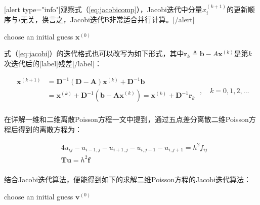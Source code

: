 \documentclass[12pt, UTF8, nofonts]{ctexart}
\begin{document}
[alert type="info"]观察式（\ref{eq:jacobicomp}），Jacobi迭代中分量$x_i^{(k+1)}$的更新顺序与$i$无关，换言之，Jacobi迭代B非常适合并行计算。[/alert]

\begin{algorithm}[H]
    choose an initial guess $\boldsymbol{x}^{(0)}$ \;
\end{algorithm}

式（\ref{eq:jacobi}）的迭代格式也可以改写为如下形式，其中$\boldsymbol{r}_k\triangleq \boldsymbol{b}-A\boldsymbol{x}^{(k)}$是第$k$次迭代后的[label]残差[/label]：

\[
    \begin{aligned}
        \boldsymbol{x}^{(k+1)} &= \boldsymbol{D}^{-1}(\boldsymbol{D}-\boldsymbol{A})\boldsymbol{x}^{(k)}+\boldsymbol{D}^{-1}\boldsymbol{b} \\
        &= \boldsymbol{x}^{(k)}+\boldsymbol{D}^{-1}(\boldsymbol{b}-\boldsymbol{Ax}^{(k)}) =
        \boldsymbol{x}^{(k)}+\boldsymbol{D}^{-1}\boldsymbol{r}_k \\
    \end{aligned} \;,\quad k=0,1,2,\ldots
\]

在详解一维和二维离散Poisson方程一文中提到，通过五点差分离散二维Poisson方程后得到的离散方程为：

\begin{eqnarray*}
    & 4u_{ij}-u_{i-1,j}-u_{i+1,j}-u_{i,j-1}-u_{i,j+1} = h^2f_{ij} \\
    & \boldsymbol{T}\boldsymbol{u} = h^2\boldsymbol{f} \\
\end{eqnarray*}

结合Jacobi迭代算法，便能得到如下的求解二维Poisson方程的Jacobi迭代算法：

\begin{algorithm}[H]
    choose an initial guess $\boldsymbol{v}^{(0)}$ \;
\end{algorithm}
\end{document}
